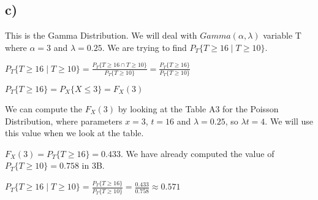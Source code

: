 \documentclass[12pt]{article}
\begin{document}
\subsection*{c)}
This is the Gamma Distribution. We will deal with $Gamma(\alpha , \lambda)$ variable T where $\alpha = 3$ and $\lambda = 0.25$. We are trying to find $P_T \lbrace T \geq 16 \mid T \geq 10 \rbrace$.\\ \par 
$P_T \lbrace T \geq 16 \mid T \geq 10 \rbrace = \frac{P_T \lbrace T \geq 16 \cap T \geq 10 \rbrace}{P_T \lbrace T \geq 10 \rbrace} = \frac{P_T \lbrace T \geq 16 \rbrace}{P_T \lbrace T \geq 10 \rbrace}$\\ \par 
$P_T\lbrace T \geq 16 \rbrace = P_X \lbrace X \leq 3 \rbrace = F_X(3)$\\ \par 
We can compute the $F_X(3)$ by looking at the Table A3 for the Poisson Distribution, where parameters $x = 3$, $t = 16$ and $\lambda = 0.25$, so $\lambda t = 4$. We will use this value when we look at the table. \\ \par 
$F_X(3) = P_T \lbrace T \geq 16 \rbrace = 0.433$. We have already computed the value of $P_T \lbrace T \geq 10 \rbrace = 0.758$ in 3B.\\ \par 
$P_T \lbrace T \geq 16 \mid T \geq 10 \rbrace = \frac{P_T \lbrace T \geq 16 \rbrace}{P_T \lbrace T \geq 10 \rbrace} = \frac{0.433}{0.758} \approx 0.571$
\end{document}
